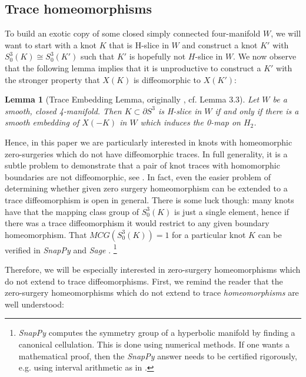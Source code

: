 \documentclass [11pt]{amsart}
\newtheorem {lemma}[theorem]{Lemma}
\theoremstyle{remark}
\begin{document}
\subsection{Trace homeomorphisms}
To build an exotic copy of some closed simply connected four-manifold $W$, we will want to start with a knot $K$ that is H-slice in $W$ and construct a knot $K'$ with $S^3_0(K)\cong S^3_0(K')$ such that $K'$ is hopefully not $H$-slice in $W$. We now observe that the following lemma implies that it is unproductive to construct a $K'$ with the stronger property that $X(K)$ is diffeomorphic to $X(K')$:

\begin{lemma}[Trace Embedding Lemma, originally \cite{FoxMilnor}, cf. \cite{HP19} Lemma 3.3]\label{lem:TEL}
Let $W$ be a smooth, closed 4-manifold. Then $K\subset \partial S^3$ is H-slice in $W$ if and only if there is a smooth embedding of $X(-K)$ in $W$ which induces the 0-map on $H_2$.  
\end{lemma}

Hence, in this paper we are particularly interested in knots with homeomorphic zero-surgeries which do not have diffeomorphic traces. In full generality, it is a subtle problem to demonstrate that a pair of knot traces with homomorphic boundaries are not diffeomorphic, see \cite{Yasui, HMP19}. In fact, even the easier problem of determining whether given zero surgery homeomorphism can be extended to a trace diffeomorphism is open in general. There is some luck though: many knots have that the mapping class group of $S^3_0(K)$ is just a single element, hence if there was a trace diffeomorphism it would restrict to any given boundary homeomorphism. That $MCG(S^3_0(K))=1$ for a particular knot $K$ can be verified in {\em SnapPy} and {\em Sage} \cite{SnapPy, Sage}. \setlength{\footnotemargin}{20pt} \footnote{{\em SnapPy} computes the symmetry group of a hyperbolic manifold by finding a canonical cellulation. This is done using numerical  methods. If one wants a mathematical proof, then the {\em SnapPy} answer needs to be certified rigorously, e.g. using interval arithmetic as in \cite{DHL}.\label{snap}}

Therefore, we will be especially interested in  zero-surgery homeomorphisms which do not extend to trace diffeomorphisms. First, we remind the reader that the zero-surgery homeomorphisms which do not extend to trace \emph{homeomorphisms} are well understood:
\end{document}
